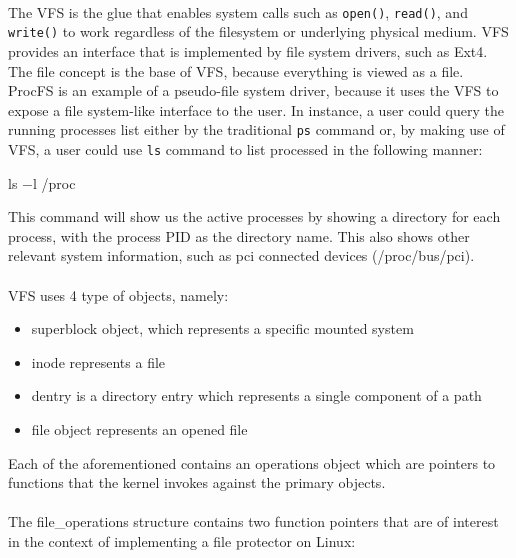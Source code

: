 	\paragraph{}
	The VFS is the glue that enables system calls such as \texttt{open()}, \texttt{read()}, and \texttt{write()} to work regardless of the filesystem or underlying physical medium\cite{LinuxKernelDevelopment}. VFS provides an interface that is implemented by file system drivers, such as Ext4. The file concept is the base of VFS, because everything is viewed as a file. ProcFS is an example of a pseudo-file system driver, because it uses the VFS to expose a file system-like interface to the user. In instance, a user could query the running processes list either by the traditional \texttt{ps} command or, by making use of VFS, a user could use \texttt{ls} command to list processed in the following manner:
	
	\bigskip
	\centerline{ls $-$l /proc}
	\bigskip
	
	This command will show us the active processes by showing a directory for each process, with the process PID as the directory name. This also shows other relevant system information, such as pci connected devices (/proc/bus/pci).
	
	\paragraph{}
	VFS uses 4 type of objects, namely:
	
	\begin{itemize}
		\item superblock object, which represents a specific mounted system
		\item inode represents a file 
		\item dentry is a directory entry which represents a single component of a path
		\item file object represents an opened file
	\end{itemize}
	
	Each of the aforementioned contains an operations object which are pointers to functions that the kernel invokes against the primary objects.
	
	\paragraph{}
	The file\_operations structure contains two function pointers that are of interest in the context of implementing a file protector on Linux: \\
	
